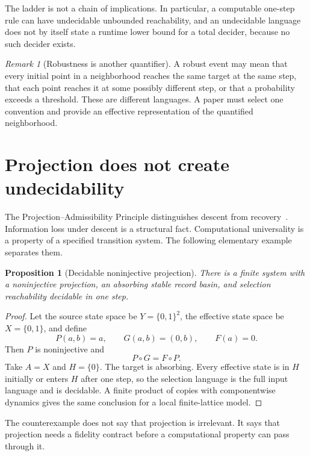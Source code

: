 \documentclass[11pt]{article}
\newtheorem{proposition}[theorem]{Proposition}
\theoremstyle{definition}
\theoremstyle{remark}
\newtheorem{remark}[theorem]{Remark}
\begin{document}
The ladder is not a chain of implications.  In particular, a computable
one-step rule can have undecidable unbounded reachability, and an undecidable
language does not by itself state a runtime lower bound for a total decider,
because no such decider exists.

\begin{remark}[Robustness is another quantifier]
A robust event may mean that every initial point in a neighborhood reaches the
same target at the same step, that each point reaches it at some possibly
different step, or that a probability exceeds a threshold.  These are
different languages.  A paper must select one convention and provide an
effective representation of the quantified neighborhood.
\end{remark}

\section{Projection does not create undecidability}

The Projection--Admissibility Principle distinguishes descent from
recovery~\cite{NeroProjection}.  Information loss under descent is a structural
fact.  Computational universality is a property of a specified transition
system.  The following elementary example separates them.

\begin{proposition}[Decidable noninjective projection]\label{prop:counterexample}
There is a finite system with a noninjective projection, an absorbing stable
record basin, and selection reachability decidable in one step.
\end{proposition}

\begin{proof}
Let the source state space be \(Y=\{0,1\}^2\), the effective state space be
\(X=\{0,1\}\), and define
\[
 P(a,b)=a,\qquad G(a,b)=(0,b),\qquad F(a)=0.
\]
Then \(P\) is noninjective and
\[
  P\circ G=F\circ P.
\]
Take \(A=X\) and \(H=\{0\}\).  The target is absorbing.  Every effective state
is in \(H\) initially or enters \(H\) after one step, so the selection language
is the full input language and is decidable.  A finite product of copies with
componentwise dynamics gives the same conclusion for a local finite-lattice
model.
\end{proof}

The counterexample does not say that projection is irrelevant.  It says that
projection needs a fidelity contract before a computational property can pass
through it.
\end{document}
